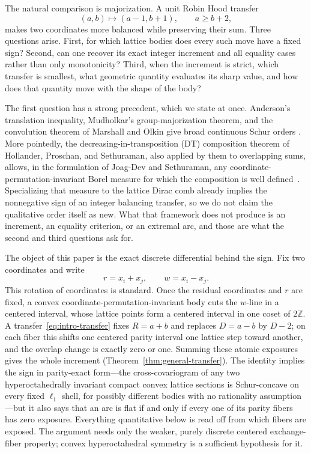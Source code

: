 \documentclass[pdflatex,sn-mathphys-num]{sn-jnl}
\theoremstyle{thmstyleone}
\theoremstyle{thmstylethree}
\theoremstyle{thmstyletwo}
\newcommand{\Z}{\mathbb Z}
\begin{document}
The natural comparison is majorization.  A unit Robin Hood transfer
\begin{equation}
 (a,b)\longmapsto(a-1,b+1),\qquad a\ge b+2,
 \label{eq:intro-transfer}
\end{equation}
makes two coordinates more balanced while preserving their sum.  Three
questions arise.  First, for which lattice bodies does every such move have a
fixed sign?  Second, can one recover its exact integer increment and all
equality cases rather than only monotonicity?  Third, when the increment is
strict, which transfer is smallest, what geometric quantity evaluates its
sharp value, and how does that quantity move with the shape of the body?

The first question has a strong precedent, which we state at once.
Anderson's translation inequality, Mudholkar's group-majorization theorem,
and the convolution theorem of Marshall and Olkin give broad continuous
Schur orders \cite{Anderson55,Mudholkar66,MarshallOlkin74}.  More pointedly,
the decreasing-in-transposition (DT) composition theorem of Hollander,
Proschan, and Sethuraman, also applied by them to overlapping sums, allows,
in the formulation of Joag-Dev and Sethuraman, any
coordinate-permutation-invariant Borel measure for which the composition is
well defined~\cite{HollanderProschanSethuraman77,%
HollanderProschanSethuraman81,JoagDevSethuraman92}.  Specializing that
measure to the lattice Dirac comb already implies the nonnegative sign of an
integer balancing transfer, so we do not claim the qualitative order itself
as new.  What that framework does not produce is an increment, an equality
criterion, or an extremal arc, and those are what the second and third
questions ask for.

The object of this paper is the exact discrete differential behind the sign.
Fix two coordinates and write
\[
 r=x_i+x_j,\qquad w=x_i-x_j.
\]
This rotation of coordinates is standard.
Once the residual coordinates and $r$ are fixed, a convex
coordinate-permutation-invariant body cuts the $w$-line in a centered
interval, whose lattice points form a centered interval in one coset of
$2\Z$.  A transfer~\eqref{eq:intro-transfer} fixes $R=a+b$ and replaces
$D=a-b$ by $D-2$; on each fiber this shifts one centered parity interval one
lattice step toward another, and the overlap change is exactly zero or one.
Summing these atomic exposures gives the whole increment
(Theorem~\ref{thm:general-transfer}).  The identity implies the sign in
parity-exact form---the cross-covariogram of any two hyperoctahedrally
invariant compact convex lattice sections is Schur-concave on every fixed
$\ell_1$ shell, for possibly different bodies with no rationality
assumption---but it also says that an arc is flat if and only if every one of
its parity fibers has zero exposure.  Everything quantitative below is read
off from which fibers are exposed.  The argument needs only the weaker,
purely discrete centered exchange-fiber property; convex hyperoctahedral
symmetry is a sufficient hypothesis for it.
\end{document}
